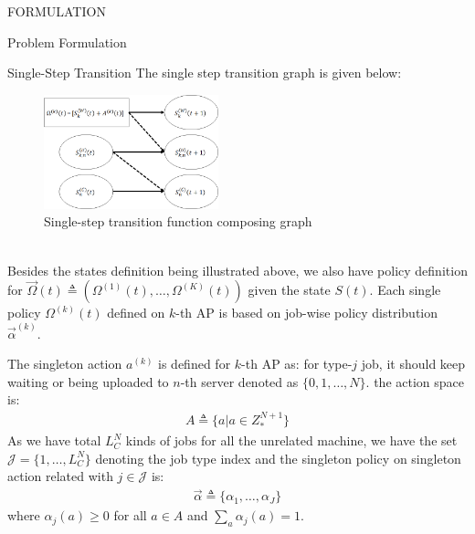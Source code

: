 \documentclass[10pt, conference, letterpaper]{IEEEtran}
\begin{document}
\begin{section}{FORMULATION}
\begin{subsection}{Problem Formulation}
\begin{subsubsection}{Single-Step Transition}
                The single step transition graph is given below:
                \begin{figure}[h]
                    \centering
                    \includegraphics[width=0.45\textwidth]{single-transition.png}
                    \caption{Single-step transition function composing graph}
                    \label{fig:trans}
                \end{figure}
                \\
                Besides the states definition being illustrated above, we also have policy definition for $\vec{\Omega}(t) \triangleq (\Omega^{(1)}(t), \dots, \Omega^{(K)}(t))$ given the state $S(t)$. Each single policy $\Omega^{(k)}(t)$ defined on $k$-th AP is based on job-wise policy distribution $\vec{\alpha}^{(k)}$.

                The singleton action $a^{(k)}$ is defined for $k$-th AP as: for type-$j$ job, it should keep waiting or being uploaded to $n$-th server denoted as $\{0,1,\dots,N\}$. the action space is:
                \begin{align}
                    A \triangleq \{a|a \in Z_*^{N+1}\}
                \end{align}
                As we have total $L_C^{N}$ kinds of jobs for all the unrelated machine, we have the set $\mathcal{J}=\{1, \dots, L_C^{N}\}$ denoting the job type index and the singleton policy on singleton action related with $j \in \mathcal{J}$ is:
                \begin{align}
                    \vec{\alpha} \triangleq \{\alpha_1,\dots,\alpha_J\}
                \end{align}
                where $\alpha_j(a) \geq 0$ for all $a \in A$ and $\sum_a \alpha_j(a) = 1$.


\end{subsubsection}
\end{subsection}
\end{section}
\end{document}
